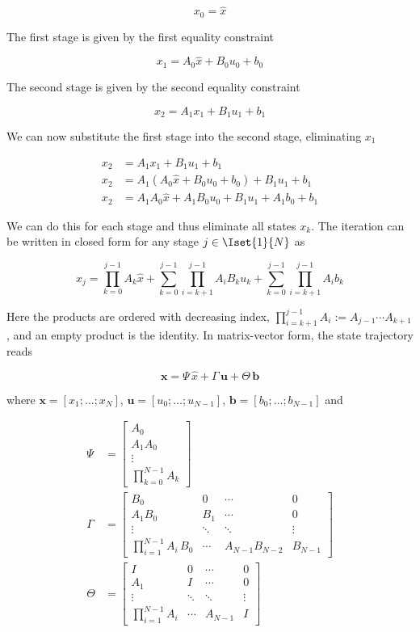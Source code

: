 \[
x_0 = \hat{x}
\]

The first stage is given by the first equality constraint

\[
x_1 = A_0 \hat{x} + B_0 u_0 + b_0
\]

The second stage is given by the second equality constraint

\[
x_2 = A_1 x_1 + B_1 u_1 + b_1
\]

We can now substitute the first stage into the second stage, eliminating $x_1$

\begin{align*}
    x_2 &= A_1 x_1 + B_1 u_1 + b_1 \\
    x_2 &= A_1 \left( A_0 \hat{x} + B_0 u_0 + b_0 \right) + B_1 u_1 + b_1 \\
    x_2 &= A_1 A_0 \hat{x} + A_1 B_0 u_0 + B_1 u_1 + A_1 b_0 + b_1
\end{align*}

We can do this for each stage and thus eliminate all states $x_k$.
The iteration can be written in closed form for any stage $j \in \Iset{1}{N}$ as

\[
x_j = \prod_{k=0}^{j-1} A_k \hat{x} + \sum_{k=0}^{j-1} \prod_{i=k+1}^{j-1} A_i B_k u_k + \sum_{k=0}^{j-1} \prod_{i=k+1}^{j-1} A_i b_k
\]

Here the products are ordered with decreasing index, $\prod_{i=k+1}^{j-1} A_i := A_{j-1} \cdots A_{k+1}$, and an empty product is the identity.
In matrix-vector form, the state trajectory reads

\[
\mathbf{x} = \Psi\,\hat{x} + \Gamma\,\mathbf{u} + \Theta\,\mathbf{b}
\]

where $\mathbf{x} = [x_1; \dots; x_N]$, $\mathbf{u} = [u_0; \dots; u_{N-1}]$, $\mathbf{b} = [b_0; \dots; b_{N-1}]$ and

\begin{align*}
    \Psi &= \begin{bmatrix} 
        A_0 \\ 
        A_1 A_0 \\ 
        \vdots \\ 
        \prod_{k=0}^{N-1} A_k 
    \end{bmatrix} \\
    \Gamma &= \begin{bmatrix} 
        B_0 & 0 & \cdots & 0 \\ 
        A_1 B_0 & B_1 & \cdots & 0 \\ 
        \vdots & \ddots & \ddots & \vdots \\ 
        \prod_{i=1}^{N-1} A_i\, B_0 & \cdots & A_{N-1} B_{N-2} & B_{N-1} 
    \end{bmatrix} \\
    \Theta &= \begin{bmatrix} 
        I & 0 & \cdots & 0 \\ 
        A_1 & I & \cdots & 0 \\ 
        \vdots & \ddots & \ddots & \vdots \\ 
        \prod_{i=1}^{N-1} A_i & \cdots & A_{N-1} & I 
    \end{bmatrix}
\end{align*}

